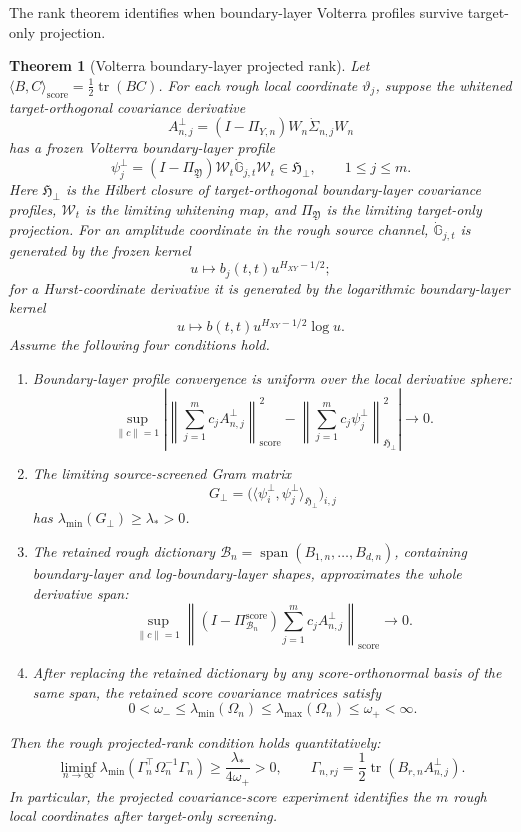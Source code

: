 \documentclass[11pt,a4paper]{amsart}
\theoremstyle{plain}
\newtheorem{theorem}{Theorem}[section]
\theoremstyle{definition}
\theoremstyle{remark}
\DeclareMathOperator{\tr}{tr}
\DeclareMathOperator{\spanop}{span}
\newcommand{\scrB}{\mathcal{B}}
\begin{document}
The rank theorem identifies when boundary-layer Volterra profiles survive target-only projection.

\begin{theorem}[Volterra boundary-layer projected rank]\label{thm:volterra-boundary-layer-rank}
Let \(\langle B,C\rangle_{\mathrm{score}}=\frac12\tr(BC)\).  For each rough local coordinate
\(\vartheta_j\), suppose the whitened target-orthogonal covariance derivative
\[
        A_{n,j}^\perp=(I-\Pi_{Y,n})W_n\dot\Sigma_{n,j}W_n
\]
has a frozen Volterra boundary-layer profile
\[
        \psi_j^\perp
        =
        (I-\Pi_{\mathfrak Y})\mathcal W_t\dot{\mathbb G}_{j,t}\mathcal W_t
        \in\mathfrak H_\perp,
        \qquad 1\le j\le m.
\]
Here \(\mathfrak H_\perp\) is the Hilbert closure of target-orthogonal boundary-layer covariance
profiles, \(\mathcal W_t\) is the limiting whitening map, and \(\Pi_{\mathfrak Y}\) is the limiting
target-only projection.  For an amplitude coordinate in the rough source channel,
\(\dot{\mathbb G}_{j,t}\) is generated by the frozen kernel
\[
        u\mapsto b_j(t,t)u^{H_{XY}-1/2};
\]
for a Hurst-coordinate derivative it is generated by the logarithmic boundary-layer kernel
\[
        u\mapsto b(t,t)u^{H_{XY}-1/2}\log u.
\]
Assume the following four conditions hold.
\begin{enumerate}[label=(\roman*)]
\item Boundary-layer profile convergence is uniform over the local derivative sphere:
\[
        \sup_{\|c\|=1}
        \left|
        \left\|
        \sum_{j=1}^m c_jA_{n,j}^\perp
        \right\|_{\mathrm{score}}^2
        -
        \left\|
        \sum_{j=1}^m c_j\psi_j^\perp
        \right\|_{\mathfrak H_\perp}^2
        \right|
        \to0.
\]
\item The limiting source-screened Gram matrix
\[
        G_\perp=
        \bigl(\langle\psi_i^\perp,\psi_j^\perp\rangle_{\mathfrak H_\perp}\bigr)_{i,j}
\]
has \(\lambda_{\min}(G_\perp)\ge\lambda_*>0\).
\item The retained rough dictionary
\(\scrB_n=\spanop(B_{1,n},\dots,B_{d,n})\), containing boundary-layer and log-boundary-layer
shapes, approximates the whole derivative span:
\[
        \sup_{\|c\|=1}
        \left\|
        (I-\Pi_{\scrB_n}^{\mathrm{score}})
        \sum_{j=1}^m c_jA_{n,j}^\perp
        \right\|_{\mathrm{score}}
        \to0.
\]
\item After replacing the retained dictionary by any score-orthonormal basis of the same span, the
retained score covariance matrices satisfy
\[
        0<\omega_-\le\lambda_{\min}(\Omega_n)
        \le\lambda_{\max}(\Omega_n)\le\omega_+<\infty.
\]
\end{enumerate}
Then the rough projected-rank condition holds quantitatively:
\[
        \liminf_{n\to\infty}
        \lambda_{\min}
        \left(
        \Gamma_n^\top\Omega_n^{-1}\Gamma_n
        \right)
        \ge
        \frac{\lambda_*}{4\omega_+}>0,
        \qquad
        \Gamma_{n,rj}=\frac12\tr(B_{r,n}A_{n,j}^\perp).
\]
In particular, the projected covariance-score experiment identifies the \(m\) rough local
coordinates after target-only screening.
\end{theorem}
\end{document}
